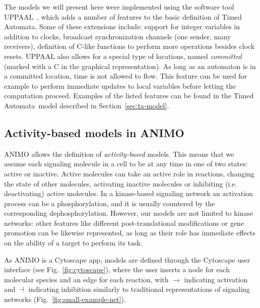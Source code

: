 \documentclass{llncs}
\newcommand{\tas}{Timed Automata}
\begin{document}
The models we will present here were implemented using the software tool UPPAAL~\cite{uppaal}, which adds a number of features
to the basic definition of \tas. Some of these extensions include: support for integer variables in addition to clocks,
broadcast synchronization channels (one sender, many receivers), definition of C-like functions to perform more 
operations besides clock resets.
UPPAAL also allows for a special type of locations, named \emph{committed} (marked with a {\sf C} in the graphical representation).
As long as an automaton is in a committed location, time is not allowed to flow. This feature can be used for example to perform immediate
updates to local variables before letting the computation proceed. Examples of the listed features can be found in the
\tas\ model described in Section~\ref{sec:ta-model}.


\subsection{Activity-based models in ANIMO}\label{sec:animo-old}
ANIMO allows the definition of \emph{activity-based} models. This means that we assume each signaling molecule in a
cell to be at any time in one of two states: active or inactive. Active molecules can take an active role in reactions,
changing the state of other molecules, activating inactive molecules or inhibiting (i.e. deactivating) active molecules.
In a kinase-based signaling network an activation process can be
a phosphorylation, and it is usually countered by the corresponding dephosphorylation. However, 
our models are not limited to kinase networks: other features like different post-translational
modifications or gene promotion can be likewise represented, as long as their role has immediate effects on the ability of a
target to perform its task.

As ANIMO is a Cytoscape app, models are defined through the Cytoscape user interface (see Fig.~\ref{fig:cytoscape}), where the user inserts
a node for each molecular species and an edge for each reaction, with $\rightarrow$ indicating activation
and $\dashv$ indicating inhibition similarly to traditional representations of signaling networks (Fig.~\ref{fig:small-example-net}).
\end{document}
